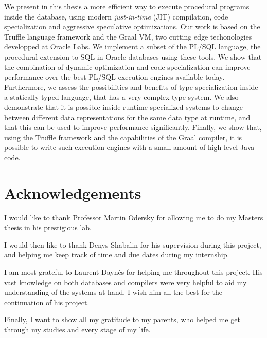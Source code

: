 \documentclass[twoside,11pt,a4paper]{article}
\begin{document}
We present in this thesis a more efficient way to execute procedural programs inside the database, using modern \textit{just-in-time} (JIT) compilation, code specialization and aggressive speculative optimizations. Our work is based on the Truffle language framework and the Graal VM, two cutting edge techonologies developped at Oracle Labs. We implement a subset of the PL/SQL language, the procedural extension to SQL in Oracle databases using these tools. We show that the combination of dynamic optimization and code specialization can improve performance over the best PL/SQL execution engines available today. Furthermore, we assess the possibilities and benefits of type specialization inside a statically-typed language, that has a very complex type system. We also demonstrate that it is possible inside runtime-specialized systems to change between different data representations for the same data type at runtime, and that this can be used to improve performance significantly. Finally, we show that, using the Truffle framework and the capabilities of the Graal compiler, it is possible to write such execution engines with a small amount of high-level Java code.


\newpage
\section*{Acknowledgements}
\label{sec:acknowledgements}

I would like to thank Professor Martin Odersky for allowing me to do my Masters thesis in his prestigious lab.

I would then like to thank Denys Shabalin for his supervision during this project, and helping me keep track of time and due dates during my internship.

I am most grateful to Laurent Daynès for helping me throughout this project. His vast knowledge on both databases and compilers were very helpful to aid my understanding of the systems at hand. I wish him all the best for the continuation of his project.

Finally, I want to show all my gratitude to my parents, who helped me get through my studies and every stage of my life.

\newpage

\tableofcontents

\newpage
\end{document}
